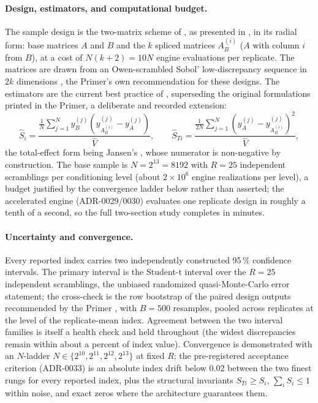 \paragraph{Design, estimators, and computational budget.}
The sample design is the two-matrix scheme of \textcite{saltelli_2002}, as
presented in \textcite[\S 4.6]{saltelli_primer_2008}, in its radial form:
base matrices $A$ and $B$ and the $k$ spliced matrices $A_B^{(i)}$ ($A$
with column $i$ from $B$), at a cost of $N(k+2) = 10N$ engine evaluations
per replicate. The matrices are drawn from an Owen-scrambled Sobol'
low-discrepancy sequence in $2k$ dimensions \parencite{owen_1997}, the
Primer's own recommendation for these designs. The estimators are the
current best practice of \textcite{saltelli_2010}, superseding the original
formulations printed in the Primer, a deliberate and recorded extension:
\begin{equation}
  \widehat{S}_i = \frac{\frac{1}{N}\sum_{j=1}^{N}
      y_B^{(j)}\left(y_{A_B^{(i)}}^{(j)} - y_A^{(j)}\right)}{\widehat{V}},
  \qquad
  \widehat{S}_{Ti} = \frac{\frac{1}{2N}\sum_{j=1}^{N}
      \left(y_A^{(j)} - y_{A_B^{(i)}}^{(j)}\right)^2}{\widehat{V}},
  \label{eq:estimators}
\end{equation}
the total-effect form being Jansen's \parencite{jansen_1999}, whose
numerator is non-negative by construction. The base sample is $N = 2^{13} =
8192$ with $R = 25$ independent scramblings per conditioning level (about
$2 \times 10^6$ engine realizations per level), a budget justified by the
convergence ladder below rather than asserted; the accelerated engine
(ADR-0029/0030) evaluates one replicate design in roughly a tenth of a
second, so the full two-section study completes in minutes.

\paragraph{Uncertainty and convergence.}
Every reported index carries two independently constructed 95\,\%
confidence intervals. The primary interval is the Student-t interval over
the $R = 25$ independent scramblings, the unbiased randomized
quasi-Monte-Carlo error statement; the cross-check is the row bootstrap of
the paired design outputs recommended by the Primer
\parencite[p.~166]{saltelli_primer_2008, archer_1997}, with $B = 500$
resamples, pooled across replicates at the level of the replicate-mean
index. Agreement between the two interval families is itself a
health check and held throughout (the widest discrepancies remain within
about a percent of index value). Convergence is demonstrated with an
$N$-ladder $N \in \{2^{10}, 2^{11}, 2^{12}, 2^{13}\}$ at fixed $R$; the
pre-registered acceptance criterion (ADR-0033) is an absolute index drift
below 0.02 between the two finest rungs for every reported index, plus the
structural invariants $S_{Ti} \geq S_i$, $\sum_i S_i \leq 1$ within noise,
and exact zeros where the architecture guarantees them.


